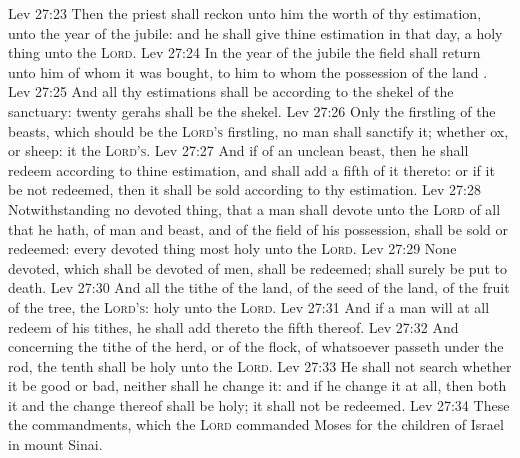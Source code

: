 \vs Lev 27:23 Then the priest shall reckon unto him the worth of thy estimation,  unto the year of the jubile: and he shall give thine estimation in that day,  a holy thing unto the \textsc{Lord}.
\vs Lev 27:24 In the year of the jubile the field shall return unto him of whom it was bought,  to him to whom the possession of the land .
\vs Lev 27:25 And all thy estimations shall be according to the shekel of the sanctuary: twenty gerahs shall be the shekel.
\vs Lev 27:26 Only the firstling of the beasts, which should be the \textsc{Lord's} firstling, no man shall sanctify it; whether  ox, or sheep: it  the \textsc{Lord's}.
\vs Lev 27:27 And if  of an unclean beast, then he shall redeem  according to thine estimation, and shall add a fifth  of it thereto: or if it be not redeemed, then it shall be sold according to thy estimation.
\vs Lev 27:28 Notwithstanding no devoted thing, that a man shall devote unto the \textsc{Lord} of all that he hath,  of man and beast, and of the field of his possession, shall be sold or redeemed: every devoted thing  most holy unto the \textsc{Lord}.
\vs Lev 27:29 None devoted, which shall be devoted of men, shall be redeemed;  shall surely be put to death.
\vs Lev 27:30 And all the tithe of the land,  of the seed of the land,  of the fruit of the tree,  the \textsc{Lord's}:  holy unto the \textsc{Lord}.
\vs Lev 27:31 And if a man will at all redeem  of his tithes, he shall add thereto the fifth  thereof.
\vs Lev 27:32 And concerning the tithe of the herd, or of the flock,  of whatsoever passeth under the rod, the tenth shall be holy unto the \textsc{Lord}.
\vs Lev 27:33 He shall not search whether it be good or bad, neither shall he change it: and if he change it at all, then both it and the change thereof shall be holy; it shall not be redeemed.
\vs Lev 27:34 These  the commandments, which the \textsc{Lord} commanded Moses for the children of Israel in mount Sinai.
